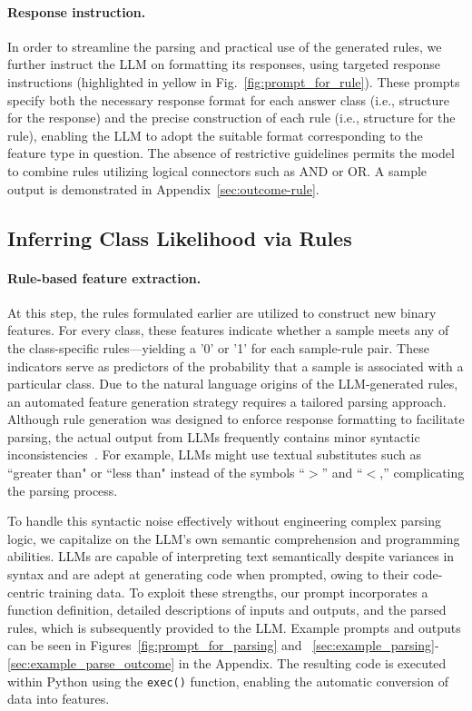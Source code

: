 \vspace*{-0.12in}
\paragraph{Response instruction.} In order to streamline the parsing and practical use of the generated rules, we further instruct the LLM on formatting its responses, using targeted response instructions (highlighted in yellow in Fig.~\ref{fig:prompt_for_rule}). These prompts specify both the necessary response format for each answer class (i.e., structure for the response) and the precise construction of each rule (i.e., structure for the rule), enabling the LLM to adopt the suitable format corresponding to the feature type in question. The absence of restrictive guidelines permits the model to combine rules utilizing logical connectors such as AND or OR. A sample output is demonstrated in Appendix~\ref{sec:outcome-rule}.

\subsection{Inferring Class Likelihood via Rules}
\label{Sec:training}

\paragraph{Rule-based feature extraction.} At this step, the rules formulated earlier are utilized to construct new binary features. For every class, these features indicate whether a sample meets any of the class-specific rules—yielding a '0' or '1' for each sample-rule pair. These indicators serve as predictors of the probability that a sample is associated with a particular class. Due to the natural language origins of the LLM-generated rules, an automated feature generation strategy requires a tailored parsing approach. Although rule generation was designed to enforce response formatting to facilitate parsing, the actual output from LLMs frequently contains minor syntactic inconsistencies~\cite{kovavc2023large}. For example, LLMs might use textual substitutes such as ``greater than" or ``less than" instead of the symbols ``$>$” and ``$<$,” complicating the parsing process.

To handle this syntactic noise effectively without engineering complex parsing logic, we capitalize on the LLM's own semantic comprehension and programming abilities. LLMs are capable of interpreting text semantically despite variances in syntax and are adept at generating code when prompted, owing to their code-centric training data. To exploit these strengths, our prompt incorporates a function definition, detailed descriptions of inputs and outputs, and the parsed rules, which is subsequently provided to the LLM. Example prompts and outputs can be seen in Figures~\ref{fig:prompt_for_parsing} and ~\ref{sec:example_parsing}-\ref{sec:example_parse_outcome} in the Appendix. The resulting code is executed within Python using the \texttt{exec()} function, enabling the automatic conversion of data into features.

